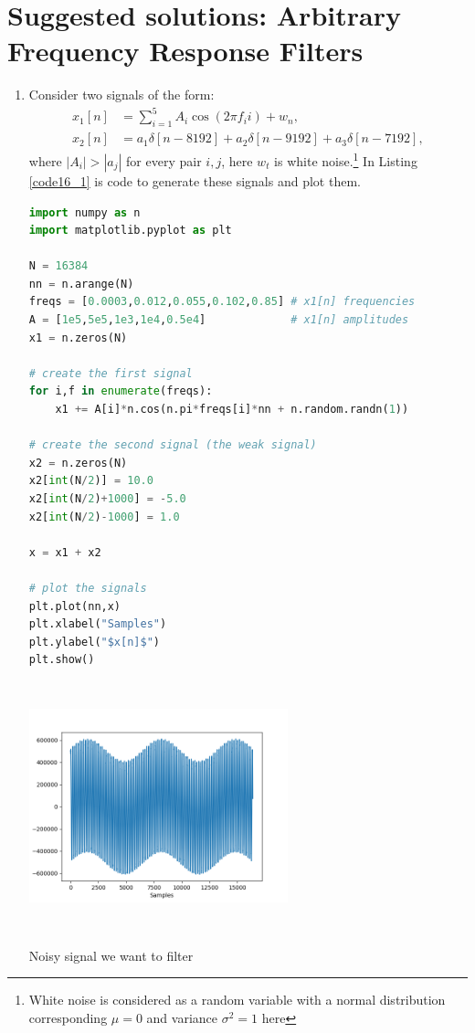 \newpage
\section{Suggested solutions: Arbitrary Frequency Response Filters}
\begin{enumerate}
\item Consider two signals of the form:
\begin{align*}
    x_{1}[n]&=\sum_{i=1}^{5}A_{i}\cos(2\pi f_{i}i)+w_{n}, \\
    x_{2}[n]&=a_1\delta[n-8192] + a_2\delta[n-9192] + a_3\delta[n-7192],
\end{align*}
where $|A_{i}|>|a_{j}|$ for every pair $i,j$, here $w_t$ is white noise.\footnote{White noise is considered as a random variable with a normal distribution corresponding $\mu=0$ and variance $\sigma^{2}=1$ here} In Listing \ref{code16_1} is code to generate these signals and plot them. 
\begin{lstlisting}[language=Python, caption=Example signal code,label=code16_1]
import numpy as n
import matplotlib.pyplot as plt

N = 16384
nn = n.arange(N)
freqs = [0.0003,0.012,0.055,0.102,0.85] # x1[n] frequencies
A = [1e5,5e5,1e3,1e4,0.5e4]             # x1[n] amplitudes
x1 = n.zeros(N)

# create the first signal
for i,f in enumerate(freqs):
    x1 += A[i]*n.cos(n.pi*freqs[i]*nn + n.random.randn(1))

# create the second signal (the weak signal)
x2 = n.zeros(N)
x2[int(N/2)] = 10.0
x2[int(N/2)+1000] = -5.0
x2[int(N/2)-1000] = 1.0

x = x1 + x2

# plot the signals
plt.plot(nn,x)
plt.xlabel("Samples")
plt.ylabel("$x[n]$")
plt.show()
\end{lstlisting}

\begin{marginfigure}
    \centering
    \includegraphics[width=7.5cm,height=7.2cm]{ch17/figures/ex16_1.png}
    \caption{Noisy signal we want to filter}
    \label{fig16_1}
\end{marginfigure}


\end{enumerate}
